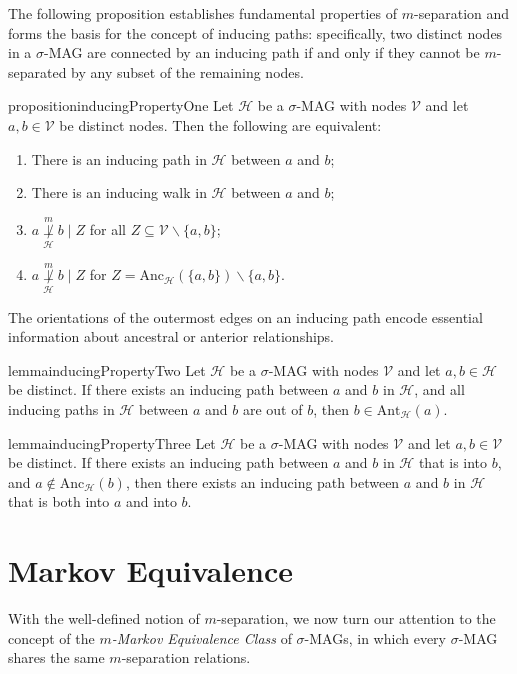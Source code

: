\documentclass[accepted]{uai2025} %
\newcommand{\anc}{\text{Anc}}
\newcommand{\ant}{\text{Ant}}
\begin{document}
The following proposition establishes fundamental properties of \( m \)-separation and forms the basis for the concept of inducing paths: specifically, two distinct nodes in a \( \sigma \)-MAG are connected by an inducing path if and only if they cannot be \( m \)-separated by any subset of the remaining nodes.

\begin{restatable}{proposition}{inducingPropertyOne}\label{inducing property one}
Let $\mathcal{H}$ be a $\sigma$-MAG with nodes $\mathcal{V}$ and let $a,b\in \mathcal{V}$ be distinct nodes. Then the following are equivalent:
\begin{enumerate}
    \item There is an inducing path in $\mathcal{H}$ between $a$ and $b$;
    \item There is an inducing walk in $\mathcal{H}$ between $a$ and $b$;
    \item $a\overset{m}{\underset{\mathcal{H}}{\not\perp}} b\mid Z$ for all $Z\subseteq  \mathcal{V}\backslash\{a,b\}$;
    \item $a\overset{m}{\underset{\mathcal{H}}{\not\perp}} b\mid Z$ for $Z=\anc_\mathcal{H}(\{a,b\} )\backslash\{a,b\}$.
\end{enumerate}
\end{restatable}

The orientations of the outermost edges on an inducing path encode essential information about ancestral or anterior relationships.

\begin{restatable}{lemma}{inducingPropertyTwo}
Let $\mathcal{H}$ be a $\sigma$-MAG with nodes $\mathcal{V}$ and let $a,b\in  \mathcal{H}$ be distinct. If there exists an inducing path between $a$ and $b$ in $\mathcal{H}$, and all inducing paths in $\mathcal{H}$ between $a$ and $b$ are out of $b$, then $b\in\ant_\mathcal{H}(a)$.
\end{restatable}


\begin{restatable}{lemma}{inducingPropertyThree}
Let $\mathcal{H}$ be a $\sigma$-MAG with nodes $\mathcal{V}$ and let $a,b\in\mathcal{V}$ be distinct. If there exists an inducing path between $a$ and $b$ in $\mathcal{H}$ that is into $b$, and $a\notin\anc_\mathcal{H}(b)$, then there exists an inducing path between $a$ and $b$ in $\mathcal{H}$ that is both into $a$ and into $b$.
\end{restatable}




\section{Markov Equivalence} \label{section:3}
With the well-defined notion of $m$-separation, we now turn our attention to the concept of the \emph{$m$-Markov Equivalence Class} of $\sigma$-MAGs, in which every $\sigma$-MAG shares the same $m$-separation relations.
\end{document}

